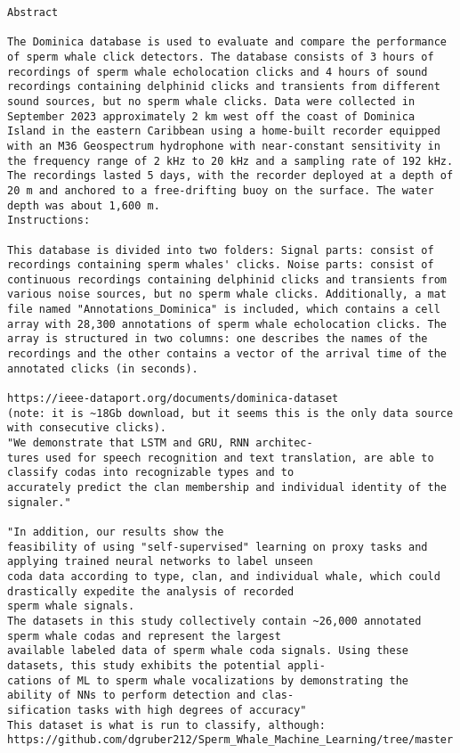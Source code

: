 \documentclass{article}
\begin{document}
\begin{lstlisting}[breaklines=true, breakatwhitespace=true, columns=flexible, basicstyle=\ttfamily\small]
Abstract 

The Dominica database is used to evaluate and compare the performance of sperm whale click detectors. The database consists of 3 hours of recordings of sperm whale echolocation clicks and 4 hours of sound recordings containing delphinid clicks and transients from different sound sources, but no sperm whale clicks. Data were collected in September 2023 approximately 2 km west off the coast of Dominica Island in the eastern Caribbean using a home-built recorder equipped with an M36 Geospectrum hydrophone with near-constant sensitivity in the frequency range of 2 kHz to 20 kHz and a sampling rate of 192 kHz. The recordings lasted 5 days, with the recorder deployed at a depth of 20 m and anchored to a free-drifting buoy on the surface. The water depth was about 1,600 m.
Instructions: 

This database is divided into two folders: Signal parts: consist of recordings containing sperm whales' clicks. Noise parts: consist of continuous recordings containing delphinid clicks and transients from various noise sources, but no sperm whale clicks. Additionally, a mat file named "Annotations_Dominica" is included, which contains a cell array with 28,300 annotations of sperm whale echolocation clicks. The array is structured in two columns: one describes the names of the recordings and the other contains a vector of the arrival time of the annotated clicks (in seconds).

https://ieee-dataport.org/documents/dominica-dataset
(note: it is ~18Gb download, but it seems this is the only data source with consecutive clicks).
"We demonstrate that LSTM and GRU, RNN architec-
tures used for speech recognition and text translation, are able to classify codas into recognizable types and to
accurately predict the clan membership and individual identity of the signaler."

"In addition, our results show the
feasibility of using "self-supervised" learning on proxy tasks and applying trained neural networks to label unseen
coda data according to type, clan, and individual whale, which could drastically expedite the analysis of recorded
sperm whale signals.
The datasets in this study collectively contain ~26,000 annotated sperm whale codas and represent the largest
available labeled data of sperm whale coda signals. Using these datasets, this study exhibits the potential appli-
cations of ML to sperm whale vocalizations by demonstrating the ability of NNs to perform detection and clas-
sification tasks with high degrees of accuracy"
This dataset is what is run to classify, although:
https://github.com/dgruber212/Sperm_Whale_Machine_Learning/tree/master

\end{lstlisting}
\end{document}

